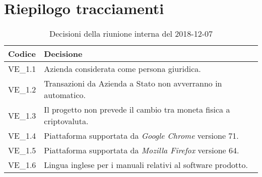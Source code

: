 \pagebreak

\section{Riepilogo tracciamenti}

	
\begin{longtable}{ >{\centering}p{} >{}p{}}
	\caption{Decisioni della riunione interna del 2018-12-07}\\	
	\rowcolorhead
	\textbf{\color{white}Codice} 
	& \centering\textbf{\color{white}Decisione} 
	\tabularnewline 
	\endfirsthead
		VE\_1.1 & Azienda considerata come persona giuridica.
		
		\tabularnewline 
		VE\_1.2 & Transazioni da Azienda a Stato non avverranno in automatico.
		
		\tabularnewline 
		VE\_1.3 & Il progetto non prevede il cambio tra moneta fisica a criptovaluta.
	
		\tabularnewline 
		VE\_1.4 & Piattaforma supportata da \textit{Google Chrome} versione 71.
		
		\tabularnewline 
		VE\_1.5 & Piattaforma supportata da \textit{Mozilla Firefox} versione 64.
		
		\tabularnewline 
		VE\_1.6 & Lingua inglese per i manuali relativi al software prodotto.
	
	\end{longtable}

